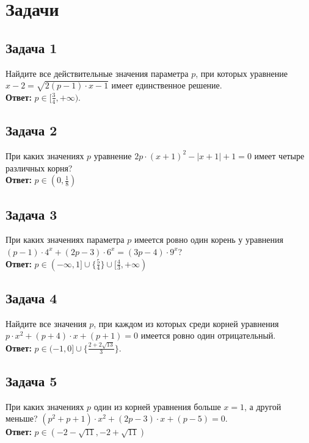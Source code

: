\section {Задачи}

\subsection * {Задача 1}
Найдите все действительные значения параметра $p$, при которых уравнение
$x - 2 = \sqrt{2(p - 1) \cdot x - 1}$ имеет единственное решение.\\
\textbf{Ответ:} $p \in [\frac{3}{4}, +\infty)$.\\

\subsection * {Задача 2}
При каких значениях $p$ уравнение $2p \cdot (x + 1)^2 - |x + 1| + 1 = 0$ имеет четыре различных
корня?\\
\textbf{Ответ:} $p \in (0, \frac{1}{8})$\\

\subsection * {Задача 3}
При каких значениях параметра $p$ имеется ровно один корень у уравнения 
$(p - 1) \cdot 4^x + (2p - 3) \cdot 6^x = (3p - 4) \cdot 9^x$?\\
\textbf{Ответ:} $p \in (-\infty, 1] \cup \{\frac{5}{4}\} \cup [\frac{4}{3}, +\infty)$\\

\subsection * {Задача 4}
Найдите все значения $p$, при каждом из которых среди корней уравнения 
$p \cdot x^2 + (p + 4) \cdot x + (p + 1) = 0 $ имеется ровно один отрицательный.\\
\textbf{Ответ:} $p \in (-1, 0] \cup \{\frac{2 + 2 \sqrt{13}}{3}\}$.\\

\subsection * {Задача 5}
При каких значениях $p$ один из корней уравнения больше $x = 1$, а другой меньше?
$(p^2 + p + 1) \cdot x^2 + (2p - 3) \cdot x + (p - 5) = 0$.\\
\textbf{Ответ:} $p \in (-2-\sqrt{11}, -2+\sqrt{11})$


